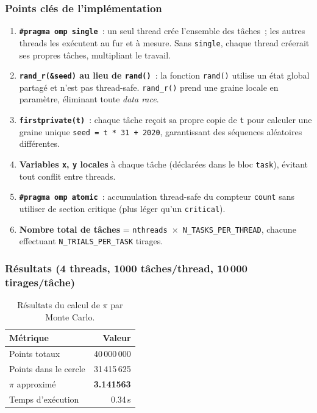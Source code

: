 \documentclass[12pt,a4paper]{article}
\begin{document}
\subsubsection{Points clés de l'implémentation}

\begin{enumerate}
  \item \textbf{\texttt{\#pragma omp single}}~: un seul thread crée l'ensemble des tâches~; les autres threads les exécutent au fur et à mesure. Sans \texttt{single}, chaque thread créerait ses propres tâches, multipliant le travail.

  \item \textbf{\texttt{rand\_r(\&seed)} au lieu de \texttt{rand()}}~: la fonction \texttt{rand()} utilise un état global partagé et n'est pas thread-safe. \texttt{rand\_r()} prend une graine locale en paramètre, éliminant toute \emph{data race}.

  \item \textbf{\texttt{firstprivate(t)}}~: chaque tâche reçoit sa propre copie de \texttt{t} pour calculer une graine unique \texttt{seed = t * 31 + 2020}, garantissant des séquences aléatoires différentes.

  \item \textbf{Variables \texttt{x}, \texttt{y} locales} à chaque tâche (déclarées dans le bloc \texttt{task}), évitant tout conflit entre threads.

  \item \textbf{\texttt{\#pragma omp atomic}}~: accumulation thread-safe du compteur \texttt{count} sans utiliser de section critique (plus léger qu'un \texttt{critical}).

  \item \textbf{Nombre total de tâches} = \texttt{nthreads $\times$ N\_TASKS\_PER\_THREAD}, chacune effectuant \texttt{N\_TRIALS\_PER\_TASK} tirages.
\end{enumerate}

\subsubsection{Résultats (4 threads, 1000 tâches/thread, 10\,000 tirages/tâche)}

\begin{table}[h]
\centering
\begin{tabular}{lr}
\toprule
\textbf{Métrique} & \textbf{Valeur} \\
\midrule
Points totaux             & 40\,000\,000 \\
Points dans le cercle     & 31\,415\,625 \\
$\pi$ approximé           & \textbf{3.141563} \\
Temps d'exécution         & 0.34\,s \\
\bottomrule
\end{tabular}
\caption{Résultats du calcul de $\pi$ par Monte Carlo.}
\end{table}
\end{document}
